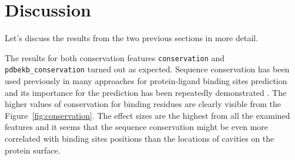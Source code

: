 \newpage
\section{Discussion}
Let's discuss the results from the two previous sections in more detail.

The results for both conservation features \texttt{conservation} and \texttt{pdbekb\_conservation} turned out as expected. Sequence conservation has been used previously in many approaches for protein-ligand binding sites prediction and its importance for the prediction has been repeatedly demonstrated \cite{ligsite, cons, casp, prankweb}. The higher values of conservation for binding residues are clearly visible from the Figure~\ref{fig:conservation}. The effect sizes are the highest from all the examined features and it seems that the sequence conservation might be even more correlated with binding sites positions than the locations of cavities on the protein surface.

